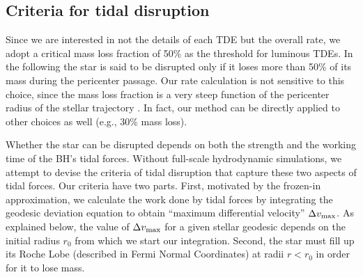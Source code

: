 \documentclass[useAMS,usenatbib]{mn2e}
\begin{document}
\subsection{Criteria for tidal disruption}\label{sec:TD_criteria}
Since we are interested in not the details of each TDE but the overall rate, we adopt a critical mass loss fraction of 50\% as the threshold for luminous TDEs. In the following the star is said to be disrupted only if it loses more than 50\% of its mass during the pericenter passage. Our rate calculation is not sensitive to this choice, since the mass loss fraction is a very steep function of the pericenter radius of the stellar trajectory \citep{guillochon13_TDE_hydro, law-smith20_TDE_hydro, Ryu2020a}. In fact, our method can be directly applied to other choices as well (e.g., 30\% mass loss).

Whether the star can be disrupted depends on both the strength and the working time of the BH's tidal forces.
Without full-scale hydrodynamic simulations, we attempt to devise the criteria of tidal disruption that capture these two aspects of tidal forces.
Our criteria have two parts.
First, motivated by the frozen-in approximation, we calculate the work done by tidal forces by integrating the geodesic deviation equation to obtain ``maximum differential velocity'' $\Delta v_{\rm max}$.
As explained below, the value of $\Delta v_{\rm max}$ for a given stellar geodesic depends on the initial radius $r_0$ from which we start our integration. Second, the star must fill up its Roche Lobe (described in Fermi Normal Coordinates) at radii $r < r_0$ in order for it to lose mass.
\end{document}
